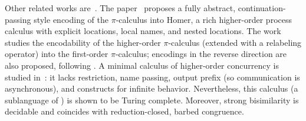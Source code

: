 Other related works are~\cite{BundgaardHG06,XuActa2012,DBLP:journals/iandc/LanesePSS11}.
The paper~\cite{BundgaardHG06} proposes a fully abstract, continuation-passing style encoding of the 
$\pi$-calculus into Homer, a rich higher-order process calculus with explicit locations, local names, and nested locations.
The work~\cite{XuActa2012} studies the encodability of the higher-order $\pi$-calculus (extended with a relabeling operator) into the first-order $\pi$-calculus; encodings in the reverse direction are also proposed, following \cite{Tho90}.
A minimal calculus of higher-order concurrency is studied in~\cite{DBLP:journals/iandc/LanesePSS11}: it lacks restriction,  name passing, output prefix (so  communication is asynchronous), and constructs for infinite behavior. 
Nevertheless, this calculus (a sublanguage of \HO) is shown to be Turing complete. Moreover, 
strong bisimilarity is decidable and coincides with reduction-closed, barbed congruence. 

